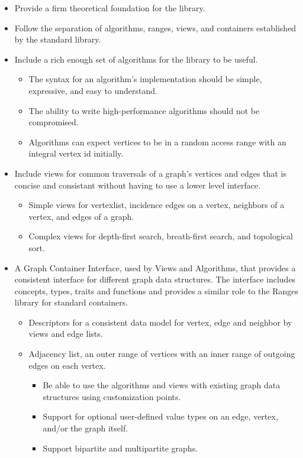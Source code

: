 \begin{itemize}
      \item Provide a firm theoretical foundation for the library.
      \item Follow the separation of algorithms, ranges, views, and containers established by the standard library.
      \item Include a rich enough set of algorithms for the library to be useful.
            \begin{itemize}
                  \item The syntax for an algorithm's implementation should be simple, expressive, and easy to understand. 
                  \item The ability to write high-performance algorithms should not be compromised.
                  \item Algorithms can expect vertices to be in a random access range with an integral vertex id initially.
            \end{itemize}
      \item Include views for common traversals of a graph's vertices and edges that is concise and consistant without having to use a lower level interface.
            \begin{itemize}
                  \item Simple views for vertexlist, incidence edges on a vertex, neighbors of a vertex, and edges of a graph.
                  \item Complex views for depth-first search, breath-first search, and topological sort.
            \end{itemize}
      \item A Graph Container Interface, used by Views and Algorithms, that provides a consistent interface for different graph data structures. The interface
            includes concepts, types, traits and functions and provides a similar role to the Ranges library for standard containers.
            \begin{itemize}
                  \item Descriptors for a consistent data model for vertex, edge and neighbor by views and edge lists.

                  \item Adjacency list, an outer range of vertices with an inner range of outgoing edges on each vertex.
                        \begin{itemize}
                              \item Be able to use the algorithms and views with existing graph data structures using customization points.
                              \item Support for optional user-defined value types on an edge, vertex, and/or the graph itself.
                              \item Support bipartite and multipartite graphs.
                        \end{itemize}


\end{itemize}
\end{itemize}

